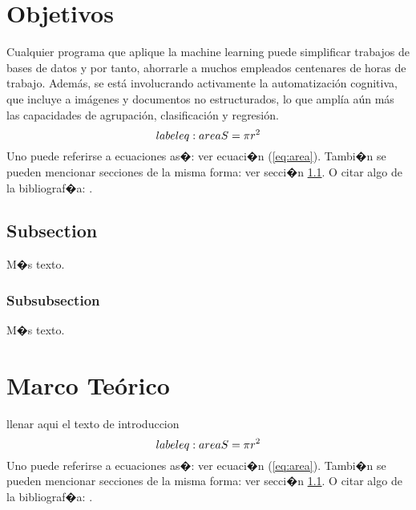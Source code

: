 \documentclass{article}
\theoremstyle{definition}
\theoremstyle{remark}
\begin{document}
\section{Objetivos}

Cualquier programa que aplique la machine learning puede simplificar trabajos de bases de datos y por tanto, ahorrarle a muchos empleados centenares de horas de trabajo. Además, se está involucrando activamente la automatización cognitiva, que incluye a imágenes y documentos no estructurados, lo que amplía aún más las capacidades de agrupación, clasificación y regresión.
\begin{equation}\\label{eq:area}
  S = \pi r^2
\end{equation}
Uno puede referirse a ecuaciones as�: ver ecuaci�n (\ref{eq:area}).
Tambi�n se pueden mencionar secciones de la misma forma: ver secci�n
\ref{sec:nada}. O citar algo de la bibliograf�a: \cite{Cd94}.

\subsection{Subsection}\label{sec:nada}

M�s texto.

\subsubsection{Subsubsection}\label{sec:nada2}

M�s texto.





\section{Marco Te\'orico}

llenar aqui el texto de introduccion
\begin{equation}\\label{eq:area}
  S = \pi r^2
\end{equation}
Uno puede referirse a ecuaciones as�: ver ecuaci�n (\ref{eq:area}).
Tambi�n se pueden mencionar secciones de la misma forma: ver secci�n
\ref{sec:nada}. O citar algo de la bibliograf�a: \cite{Cd94}.
\end{document}
